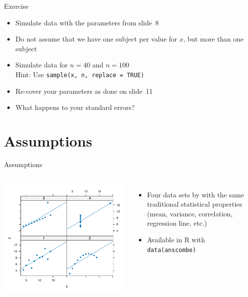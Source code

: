 \documentclass[aspectratio=169]{beamer}
\begin{document}
\begin{frame}{}
  \begin{block}{Exercise}
    \begin{itemize}
      \item Simulate data with the parameters from slide~8
      \item Do not assume that we have one subject per value for $x$, but
        more than one subject
      \item Simulate data for $n=40$ and $n=100$\\
        Hint: Use \texttt{sample(x, n, replace = TRUE)}
      \item Re-cover your parameters as done on slide~11
      \item What happens to your standard errors?
    \end{itemize}
  \end{block}
\end{frame}

\section{Assumptions}

\begin{frame}{Assumptions}
  \begin{columns}
    \includegraphics[scale=.61]{../figures/anscombe} 
  \begin{itemize}
    \item Four data sets by \citet{Anscombe1973} with the same traditional
      statistical properties (mean, variance, correlation, regression line,
      etc.)
    \item Available in R with \texttt{data(anscombe)}
  \end{itemize}
  \end{columns}
\end{frame}
\end{document}
